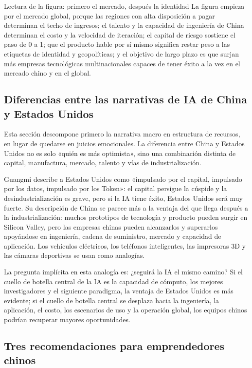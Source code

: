 \documentclass[a4paper]{article}
\begin{document}
\begin{knowledgebox}{Lectura de la figura: primero el mercado, después la identidad}
La figura empieza por el mercado global, porque las regiones con alta disposición a pagar determinan el techo de ingresos; el talento y la capacidad de ingeniería de China determinan el costo y la velocidad de iteración; el capital de riesgo sostiene el paso de 0 a 1; que el producto hable por sí mismo significa restar peso a las etiquetas de identidad y geopolíticas; y el objetivo de largo plazo es que surjan más empresas tecnológicas multinacionales capaces de tener éxito a la vez en el mercado chino y en el global.
\end{knowledgebox}

\subsection{Diferencias entre las narrativas de IA de China y Estados Unidos}

Esta sección descompone primero la narrativa macro en estructura de recursos, en lugar de quedarse en juicios emocionales. La diferencia entre China y Estados Unidos no es solo «quién es más optimista», sino una combinación distinta de capital, manufactura, mercado, talento y vías de industrialización.

Guangmi describe a Estados Unidos como «impulsado por el capital, impulsado por los datos, impulsado por los Token»: el capital persigue la cúspide y la desindustrialización es grave, pero si la IA tiene éxito, Estados Unidos será muy fuerte. Su descripción de China se parece más a la ventaja del que llega después a la industrialización: muchos prototipos de tecnología y producto pueden surgir en Silicon Valley, pero las empresas chinas pueden alcanzarlos y superarlos apoyándose en ingeniería, cadena de suministro, mercado y capacidad de aplicación. Los vehículos eléctricos, los teléfonos inteligentes, las impresoras 3D y las cámaras deportivas se usan como analogías.

La pregunta implícita en esta analogía es: ¿seguirá la IA el mismo camino? Si el cuello de botella central de la IA es la capacidad de cómputo, los mejores investigadores y el siguiente paradigma, la ventaja de Estados Unidos es más evidente; si el cuello de botella central se desplaza hacia la ingeniería, la aplicación, el costo, los escenarios de uso y la operación global, los equipos chinos podrían recuperar mayores oportunidades.

\subsection{Tres recomendaciones para emprendedores chinos}
\end{document}
